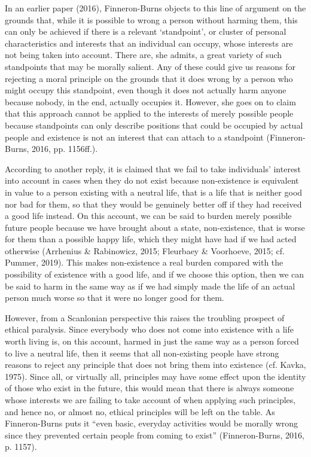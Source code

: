 \documentclass[man,11pt,a4paper]{apa7}
\begin{document}
In an earlier paper (2016), Finneron-Burns objects to this line of argument on the grounds that, while it is possible to wrong a person without harming them, this can only be achieved if there is a relevant `standpoint', or cluster of personal characteristics and interests that an individual can occupy, whose interests are not being taken into account. There are, she admits, a great variety of such standpoints that may be morally salient. Any of these could give us reasons for rejecting a moral principle on the grounds that it does wrong by a person who might occupy this standpoint, even though it does not actually harm anyone because nobody, in the end, actually occupies it. However, she goes on to claim that this approach cannot be applied to the interests of merely possible people because standpoints can only describe positions that could be occupied by actual people and existence is not an interest that can attach to a standpoint (Finneron-Burns, 2016, pp. 1156ff.).

According to another reply, it is claimed that we fail to take individuals' interest into account in cases when they do not exist because non-existence is equivalent in value to a person existing with a neutral life, that is a life that is neither good nor bad for them, so that they would be genuinely better off if they had received a good life instead. On this account, we can be said to burden merely possible future people because we have brought about a state, non-existence, that is worse for them than a possible happy life, which they might have had if we had acted otherwise (Arrhenius \& Rabinowicz, 2015; Fleurbaey \& Voorhoeve, 2015; cf. Pummer, 2019). This makes non-existence a real burden compared with the possibility of existence with a good life, and if we choose this option, then we can be said to harm in the same way as if we had simply made the life of an actual person much worse so that it were no longer good for them.

However, from a Scanlonian perspective this raises the troubling prospect of ethical paralysis. Since everybody who does not come into existence with a life worth living is, on this account, harmed in just the same way as a person forced to live a neutral life, then it seems that all non-existing people have strong reasons to reject any principle that does not bring them into existence (cf. Kavka, 1975). Since all, or virtually all, principles may have some effect upon the identity of those who exist in the future, this would mean that there is always someone whose interests we are failing to take account of when applying such principles, and hence no, or almost no, ethical principles will be left on the table. As Finneron-Burns puts it ``even basic, everyday activities would be morally wrong since they prevented certain people from coming to exist'' (Finneron-Burns, 2016, p. 1157).
\end{document}
